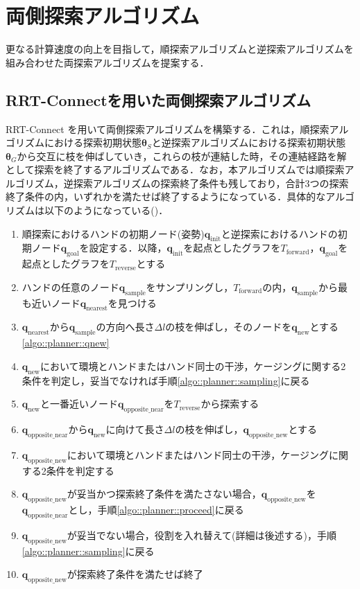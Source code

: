 \documentclass[a4paper,twoside,12pt,papersize, dvipdfmx]{iirthesis}
\begin{document}
{\section{両側探索アルゴリズム}\label{sec::planner::connect}
更なる計算速度の向上を目指して，順探索アルゴリズムと逆探索アルゴリズムを組み合わせた両探索アルゴリズムを提案する．
\subsection{RRT-Connectを用いた両側探索アルゴリズム}
RRT-Connect \cite{kuffner2000}を用いて両側探索アルゴリズムを構築する．これは，順探索アルゴリズムにおける探索初期状態$\bm {\theta}_S$と逆探索アルゴリズムにおける探索初期状態$\bm {\theta}_G$から交互に枝を伸ばしていき，これらの枝が連結した時，その連結経路を解として探索を終了するアルゴリズムである．なお，本アルゴリズムでは順探索アルゴリズム，逆探索アルゴリズムの探索終了条件も残しており，合計3つの探索終了条件の内，いずれかを満たせば終了するようになっている．具体的なアルゴリズムは以下のようになっている(\figref{})．
\begin{enumerate}
\item 順探索におけるハンドの初期ノード(姿勢)$\bm{q}_{\mathrm {init}}$と逆探索におけるハンドの初期ノード$\bm{q}_{\mathrm {goal}}$を設定する．以降，$\bm{q}_{\mathrm {init}}$を起点としたグラフを$T_{\mathrm {forward}}$，$\bm{q}_{\mathrm {goal}}$を起点としたグラフを$T_{\mathrm {reverse}}$とする
\item ハンドの任意のノード$\bm{q}_{\mathrm {sample}}$をサンプリングし，$T_{\mathrm {forward}}$の内，$\bm{q}_{\mathrm{sample}}$から最も近いノード$\bm{q}_{\mathrm{nearest}}$を見つける\label{algo::planner::sampling}
\item $\bm{q}_{\mathrm{nearest}}$から$\bm{q}_{\mathrm{sample}}$の方向へ長さ$\Delta l$の枝を伸ばし，そのノードを$\bm{q}_{\mathrm{new}}$とする \ref{algo::planner::qnew}
\item $\bm{q}_{\mathrm{new}}$において環境とハンドまたはハンド同士の干渉，ケージングに関する2条件を判定し，妥当でなければ手順\ref{algo::planner::sampling}に戻る
\item $\bm{q}_{\mathrm{new}}$と一番近いノード$\bm{q}_{\mathrm{opposite\_near}}$を$T_{\mathrm {reverse}}$から探索する\label{algo::planner::biasbegin}
\item $\bm{q}_{\mathrm{opposite\_near}}$から$\bm{q}_{\mathrm{new}}$に向けて長さ$\Delta l$の枝を伸ばし，$\bm{q}_{\mathrm{opposite\_new}}$とする\label{algo::planner::proceed}
\item $\bm{q}_{\mathrm{opposite\_new}}$において環境とハンドまたはハンド同士の干渉，ケージングに関する2条件を判定する
\item $\bm{q}_{\mathrm{opposite\_new}}$が妥当かつ探索終了条件を満たさない場合，$\bm{q}_{\mathrm{opposite\_new}}$を$\bm{q}_{\mathrm{opposite\_near}}$とし，手順\ref{algo::planner::proceed}に戻る\label{algo::planner::biasend}
\item $\bm{q}_{\mathrm{opposite\_new}}$が妥当でない場合，役割を入れ替えて(詳細は後述する)，手順\ref{algo::planner::sampling}に戻る \label{algo::planner::change}
\item $\bm{q}_{\mathrm{opposite\_new}}$が探索終了条件を満たせば終了\label{algo::planner::goalcond}
\end{enumerate}

}
\end{document}
